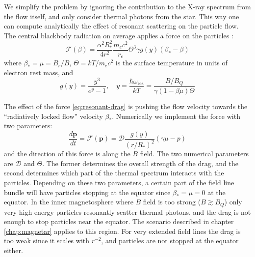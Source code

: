 We simplify the problem by ignoring the contribution to the X-ray spectrum from
the flow itself, and only consider thermal photons from the star. This way one
can compute analytically the effect of resonant scattering on the particle flow.
The central blackbody radiation on average applies a force on the particles
\citep{beloborodov_electron-positron_2012}:
\begin{equation}
  \label{eq:resonant-drag}
  \mathcal{F}(\beta) = \frac{\alpha^2R_{*}^2}{4r^2}\frac{m_{e}c^2}{r_{e}}\Theta^3\gamma g(y)(\beta_{*}-\beta)
\end{equation}
where $\beta_{*} = \mu = B_r/B$, $\Theta = kT/m_{e}c^2$ is the surface
temperature in units of electron rest mass, and
\begin{equation}
  \label{eq:y-and-gy}
  g(y) = \frac{y^3}{e^y - 1},\quad y = \frac{\hbar\omega_\mathrm{res}}{kT} = \frac{B/B_Q}{\gamma(1 - \beta\mu)\Theta}
\end{equation}

The effect of the force \eqref{eq:resonant-drag} is pushing the flow velocity
towards the ``radiatively locked flow'' velocity $\beta_{*}$. Numerically we
implement the force with two parameters:
\begin{equation}
  \label{eq:resonant-drag-numerical}
  \frac{d\mathbf{p}}{dt} = \mathcal{F}(\mathbf{p}) = \mathcal{D}\frac{g(y)}{(r/R_{*})^2}(\gamma\mu - p)
\end{equation}
and the direction of this force is along the $B$ field. The two numerical
parameters are $\mathcal{D}$ and $\Theta$. The former determines the overall
strength of the drag, and the second determines which part of the thermal
spectrum interacts with the particles. Depending on these two parameters, a
certain part of the field line bundle will have particles stopping at the
equator since $\beta_{*} = \mu = 0$ at the equator. In the inner magnetosphere
where $B$ field is too strong ($B \gtrsim B_{Q}$) only very high energy
particles resonantly scatter thermal photons, and the drag is not enough to stop
particles near the equator. The scenario described in chapter
\ref{chap:magnetar} applies to this region. For very extended field lines the
drag is too weak since it scales with $r^{-2}$, and particles are not stopped at
the equator either.



